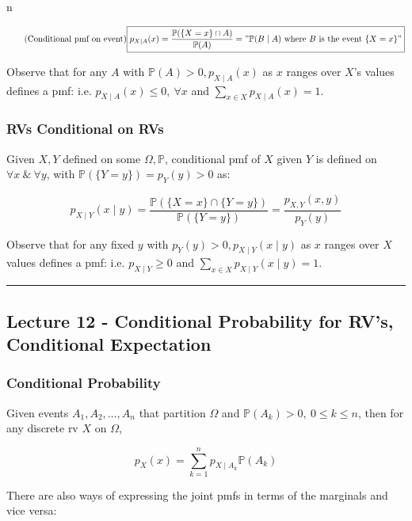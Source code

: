 n\documentclass{article}
\begin{document}
\begin{equation}
  \tag{Conditional pmf on event}
  \boxed{
    p_{X\mid A}(x) = \frac{\mathbb{P}(\{X = x\} \cap A)}
    {\mathbb{P}(A)} = "\mathbb{P}(B \mid A) \text{ where } B \text{ is
      the event } \{X=x\}"
  }
\end{equation}

Observe that for any $A$ with $\mathbb{P}(A) > 0, p_{X\mid A}(x)$ as
$x$ ranges over $X$'s values defines a pmf: i.e. $p_{X\mid A}(x) \leq
0, \  \forall x$ and $\sum_{x \in X} p_{X\mid A}(x) = 1$.

\subsubsection{RVs Conditional on RVs}

Given $X,Y$ defined on some $\Omega, \mathbb{P}$, conditional pmf of
$X$ given $Y$ is defined on $\forall x \ \& \ \forall y$, with
$\mathbb{P}(\{Y=y\}) = p_Y(y) > 0$ as:

\begin{equation}
  \tag{Conditional pmf on rv}
  \boxed{
    p_{X\mid Y}(x\mid y) = \frac{\mathbb{P}(\{X=x\} \cap \{Y=y\})}
    {\mathbb{P}(\{Y=y\})} = \frac{p_{X,Y}(x,y)}{p_Y(y)}
  }
\end{equation}

Observe that for any fixed $y$ with $p_Y(y) > 0, p_{X\mid Y}(x\mid y)$
as $x$ ranges over $X$ values defines a pmf: i.e. $p_{X\mid Y} \geq 0$
and $\sum_{x \in X} p_{X\mid Y}(x\mid y) = 1$.


\medskip\hrule
\subsection{Lecture 12 - Conditional Probability for RV's, Conditional
  Expectation}

\subsubsection{Conditional Probability}

Given events $A_1, A_2, \dots, A_n$ that partition $\Omega$ and
$\mathbb{P}(A_k) > 0,\ 0 \leq k \leq n$, then for any discrete rv $X$ on
$\Omega$,

\begin{equation}
  \tag{Conditional Total Probability}
  \boxed{
    p_X(x) = \sum_{k=1}^n p_{X \mid A_k} \mathbb{P}(A_k)
  }
\end{equation}

There are also ways of expressing the joint pmfs in terms of the
marginals and vice versa:
\end{document}
